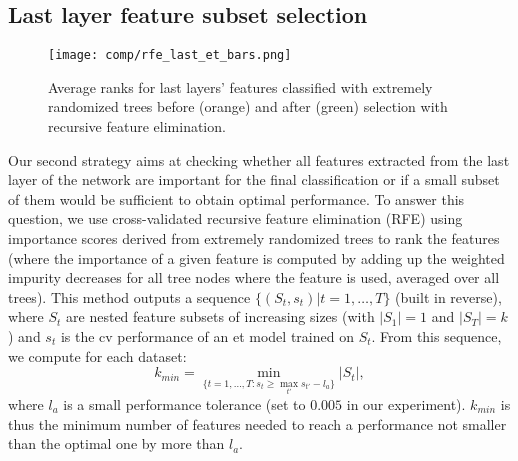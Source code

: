 \subsection{Last layer feature subset selection}
\label{ssec:comp:exp_feat_sel}


\begin{figure}
	\center 
    \texttt{[image: comp/rfe\_last\_et\_bars.png]}
    \caption{Average ranks for last layers' features classified with extremely randomized trees before (orange) and after (green) selection with recursive feature elimination.}
    \label{fig:comp:exp_rfe_last_et_cmp}
\end{figure}

Our second strategy aims at checking whether all features extracted from the last layer of the network are important for the final classification or if a small subset of them would be sufficient to obtain optimal performance. To answer this question, we use cross-validated recursive feature elimination (RFE) \parencite{guyon2002gene} using importance scores derived from extremely randomized trees to rank the features (where the importance of a given feature is computed by adding up the weighted impurity decreases for all tree nodes where the feature is used, averaged over all trees). This method outputs a sequence $\{(S_t,s_t)|t=1,\ldots,T\}$ (built in reverse), where $S_t$ are nested feature subsets of increasing sizes (with $|S_1|=1$ and $|S_T|=k$) and $s_t$ is the \acrlong{cv} performance of an \acrshort{et} model trained on $S_t$. From this sequence, we compute for each dataset:
$$k_{min} = \min_{\{t=1,\ldots,T: s_t\geq \max_{t'} s_{t'}-l_a\}} |S_t|,$$
where $l_a$ is a small performance tolerance (set to $0.005$ in our experiment). $k_{min}$ is thus the minimum number of features needed to reach a performance not smaller than the optimal one by more than $l_a$.


